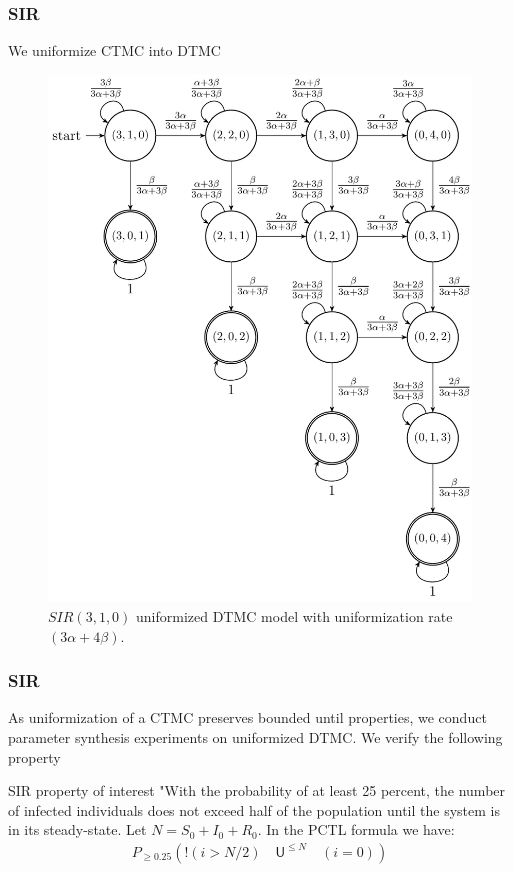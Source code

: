 \documentclass{beamer}
\begin{document}
\begin{frame}
    \frametitle{SIR}
    We uniformize CTMC into DTMC
    \begin{figure}[H]
        \centering
        \includegraphics[width=0.5\linewidth]{figures/sir310_dtmc.png}
        \caption{$SIR(3,1,0)$ uniformized DTMC model with  uniformization rate $(3\alpha + 4\beta)$.}
    \end{figure}
\end{frame}

\begin{frame}
    \frametitle{SIR}
    As uniformization of a CTMC preserves bounded until properties, we conduct parameter synthesis
    experiments on uniformized DTMC. We verify the following property
    \begin{block}{SIR property of interest}
        "With the probability of
        at least 25 percent, the number of infected individuals does not exceed half of the population until
        the system is in its steady-state. Let $N=S_0+I_0+R_0$. In the PCTL formula we have:
        \begin{align*}
            P_{\geq 0.25} ( !(i > N/2) \quad \mathsf{U}^{\leq N} \quad (i = 0) )
        \end{align*}
    \end{block}
\end{frame}
\end{document}
